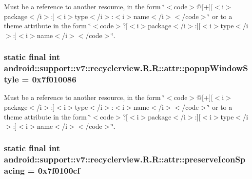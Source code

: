 Must be a reference to another resource, in the form \char`\"{}$<$code$>$@\mbox{[}+\mbox{]}\mbox{[}$<$i$>$package$<$/i$>$:\mbox{]}$<$i$>$type$<$/i$>$:$<$i$>$name$<$/i$>$$<$/code$>$\char`\"{} or to a theme attribute in the form \char`\"{}$<$code$>$?\mbox{[}$<$i$>$package$<$/i$>$:\mbox{]}\mbox{[}$<$i$>$type$<$/i$>$:\mbox{]}$<$i$>$name$<$/i$>$$<$/code$>$\char`\"{}. \hypertarget{classandroid_1_1support_1_1v7_1_1recyclerview_1_1_r_1_1attr_0c85f8264b72b0b84a02b3b1eaebc36c}{
\subsubsection[{popupWindowStyle}]{\setlength{\rightskip}{0pt plus 5cm}static final int android::support::v7::recyclerview.R.R::attr::popupWindowStyle = 0x7f010086}}
\label{classandroid_1_1support_1_1v7_1_1recyclerview_1_1_r_1_1attr_0c85f8264b72b0b84a02b3b1eaebc36c}


Must be a reference to another resource, in the form \char`\"{}$<$code$>$@\mbox{[}+\mbox{]}\mbox{[}$<$i$>$package$<$/i$>$:\mbox{]}$<$i$>$type$<$/i$>$:$<$i$>$name$<$/i$>$$<$/code$>$\char`\"{} or to a theme attribute in the form \char`\"{}$<$code$>$?\mbox{[}$<$i$>$package$<$/i$>$:\mbox{]}\mbox{[}$<$i$>$type$<$/i$>$:\mbox{]}$<$i$>$name$<$/i$>$$<$/code$>$\char`\"{}. \hypertarget{classandroid_1_1support_1_1v7_1_1recyclerview_1_1_r_1_1attr_5764799916b0cc69765e883320c04dcd}{
\subsubsection[{preserveIconSpacing}]{\setlength{\rightskip}{0pt plus 5cm}static final int android::support::v7::recyclerview.R.R::attr::preserveIconSpacing = 0x7f0100cf}}
\label{classandroid_1_1support_1_1v7_1_1recyclerview_1_1_r_1_1attr_5764799916b0cc69765e883320c04dcd}


